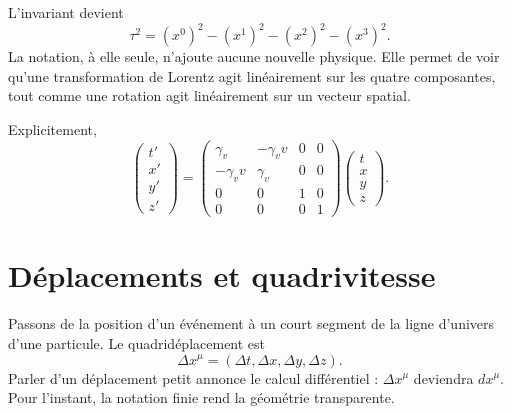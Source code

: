 L’invariant devient
\begin{equation}
\tau^2
=(x^0)^2-(x^1)^2-(x^2)^2-(x^3)^2.
\end{equation}
La notation, à elle seule, n’ajoute aucune nouvelle physique. Elle permet de voir qu’une transformation de Lorentz agit linéairement sur les quatre composantes, tout comme une rotation agit linéairement sur un vecteur spatial.

\begin{classroomqa}
\end{classroomqa}

Explicitement,
\begin{equation}
\begin{pmatrix}
t'\\x'\\y'\\z'
\end{pmatrix}
=
\begin{pmatrix}
\gamma_v&-\gamma_v v&0&0\\
-\gamma_v v&\gamma_v&0&0\\
0&0&1&0\\
0&0&0&1
\end{pmatrix}
\begin{pmatrix}
t\\x\\y\\z
\end{pmatrix}.
\label{eq:sr2-boost-matrix}
\end{equation}

\section{Déplacements et quadrivitesse}

Passons de la position d’un événement à un court segment de la ligne d’univers d’une particule. Le quadridéplacement est
\begin{equation}
\Delta x^\mu
=(\Delta t,\Delta x,\Delta y,\Delta z).
\end{equation}
Parler d’un déplacement petit annonce le calcul différentiel : \(\Delta x^\mu\) deviendra \(dx^\mu\). Pour l’instant, la notation finie rend la géométrie transparente.

